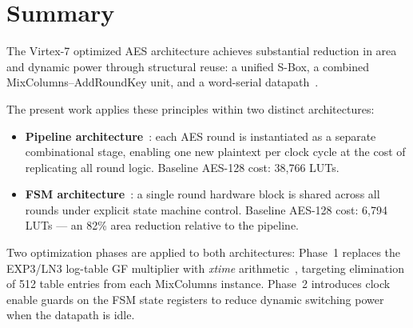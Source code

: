 \section{Summary}

The Virtex-7 optimized AES architecture achieves substantial reduction in area and dynamic
power through structural reuse: a unified S-Box, a combined MixColumns--AddRoundKey unit, and
a word-serial datapath~\cite{gunasekaran_aes256_virtex7}.

The present work applies these principles within two distinct architectures:

\begin{itemize}
    \item \textbf{Pipeline architecture}~\cite{good_pipelined_aes_2005}: each AES round is
    instantiated as a separate combinational stage, enabling one new plaintext per clock cycle
    at the cost of replicating all round logic. Baseline AES-128 cost: 38,766 LUTs.

    \item \textbf{FSM architecture}~\cite{mcloone_fsm_aes_2003}: a single round hardware block
    is shared across all rounds under explicit state machine control. Baseline AES-128 cost:
    6,794 LUTs --- an 82\% area reduction relative to the pipeline.
\end{itemize}

Two optimization phases are applied to both architectures: Phase~1 replaces the EXP3/LN3
log-table GF multiplier with \textit{xtime} arithmetic~\cite{wolkerstorfer_xtime_2002},
targeting elimination of 512 table entries from each MixColumns instance. Phase~2 introduces
clock enable guards on the FSM state registers to reduce dynamic switching power when the
datapath is idle.